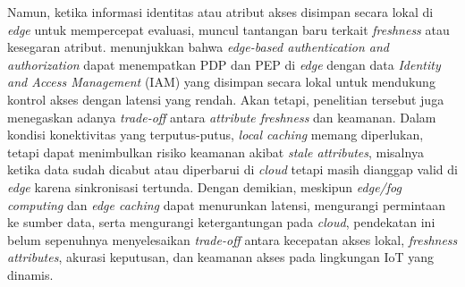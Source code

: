 Namun, ketika informasi identitas atau atribut akses disimpan secara lokal di \textit{edge} untuk mempercepat evaluasi, muncul tantangan baru terkait \textit{freshness} atau kesegaran atribut. \textcite{wang_edge-enabled_2025} menunjukkan bahwa \textit{edge-based authentication and authorization} dapat menempatkan PDP dan PEP di \textit{edge} dengan data \textit{Identity and Access Management} (IAM) yang disimpan secara lokal untuk mendukung kontrol akses dengan latensi yang rendah. Akan tetapi, penelitian tersebut juga menegaskan adanya \textit{trade-off} antara \textit{attribute freshness} dan keamanan. Dalam kondisi konektivitas yang terputus-putus, \textit{local caching} memang diperlukan, tetapi dapat menimbulkan risiko keamanan akibat \textit{stale attributes}, misalnya ketika data sudah dicabut atau diperbarui di \textit{cloud} tetapi masih dianggap valid di \textit{edge} karena sinkronisasi tertunda. Dengan demikian, meskipun \textit{edge/fog computing} dan \textit{edge caching} dapat menurunkan latensi, mengurangi permintaan ke sumber data, serta mengurangi ketergantungan pada \textit{cloud}, pendekatan ini belum sepenuhnya menyelesaikan \textit{trade-off} antara kecepatan akses lokal, \textit{freshness attributes}, akurasi keputusan, dan keamanan akses pada lingkungan IoT yang dinamis.

